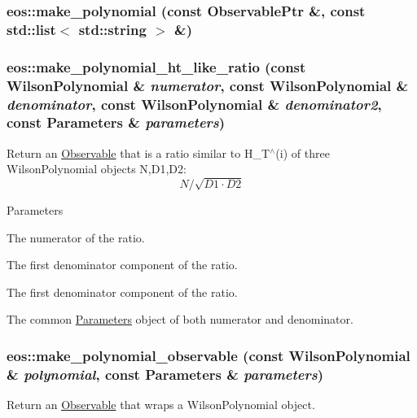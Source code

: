 \hypertarget{namespaceeos_ae661f13ba6f529e7a5c19865f6528da6}{
\subsubsection[{make\_\-polynomial}]{ eos::make\_\-polynomial (const ObservablePtr \&, \/  const std::list$<$ std::string $>$ \&)}}
\label{namespaceeos_ae661f13ba6f529e7a5c19865f6528da6}
\hypertarget{namespaceeos_a25bb05f44e3b5f6b6c5197277e22776b}{
\subsubsection[{make\_\-polynomial\_\-ht\_\-like\_\-ratio}]{ eos::make\_\-polynomial\_\-ht\_\-like\_\-ratio (const WilsonPolynomial \& {\em numerator}, \/  const WilsonPolynomial \& {\em denominator}, \/  const WilsonPolynomial \& {\em denominator2}, \/  const Parameters \& {\em parameters})}}
\label{namespaceeos_a25bb05f44e3b5f6b6c5197277e22776b}
Return an \hyperlink{classeos_1_1Observable}{Observable} that is a ratio similar to H\_\-T$^\wedge$(i) of three WilsonPolynomial objects N,D1,D2: \[N / \sqrt{D1 \cdot D2}\]


\begin{DoxyParams}{Parameters}
\item[{\em numerator}]The numerator of the ratio. \item[{\em denominator1}]The first denominator component of the ratio. \item[{\em denominator2}]The first denominator component of the ratio. \item[{\em parameters}]The common \hyperlink{classeos_1_1Parameters}{Parameters} object of both numerator and denominator. \end{DoxyParams}
\hypertarget{namespaceeos_a702bfbd9d3f9e42e94628616b8760853}{
\subsubsection[{make\_\-polynomial\_\-observable}]{ eos::make\_\-polynomial\_\-observable (const WilsonPolynomial \& {\em polynomial}, \/  const Parameters \& {\em parameters})}}
\label{namespaceeos_a702bfbd9d3f9e42e94628616b8760853}
Return an \hyperlink{classeos_1_1Observable}{Observable} that wraps a WilsonPolynomial object.


